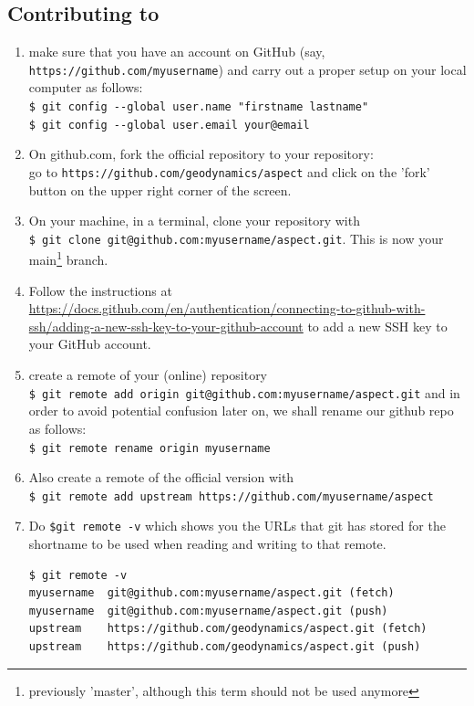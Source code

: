
\subsection{Contributing to \aspect}

\begin{enumerate}
\item make sure that you  have an account on GitHub (say, \verb"https://github.com/myusername") 
and carry out a proper setup on your local computer as follows:\\
\verb'$ git config --global user.name "firstname lastname" '\\
\verb'$ git config --global user.email your@email'

\item On github.com, fork the official \aspect repository to your repository:\\
go to \verb"https://github.com/geodynamics/aspect"
and click on the 'fork' button on the upper right corner of the screen.

\item On your machine, in a terminal, clone your repository with \\
\verb"$ git clone git@github.com:myusername/aspect.git". 
This is now your main\footnote{previously 'master', although this term should not be used anymore} branch.

\item 
Follow the instructions at \url{https://docs.github.com/en/authentication/connecting-to-github-with-ssh/adding-a-new-ssh-key-to-your-github-account}
to add a new SSH key to your GitHub account.
 
\item create a remote of your (online) repository\\
\verb"$ git remote add origin git@github.com:myusername/aspect.git"
and in order to avoid potential confusion later on, we shall rename our github repo as follows:\\
\verb"$ git remote rename origin myusername" 

\item Also create a remote of the official version with\\
\verb"$ git remote add upstream https://github.com/myusername/aspect"

\item Do \verb"$git remote -v" which shows you the URLs that git 
has stored for the shortname to be used when reading and writing to that remote.
\begin{verbatim}
$ git remote -v
myusername	git@github.com:myusername/aspect.git (fetch)
myusername	git@github.com:myusername/aspect.git (push)
upstream	https://github.com/geodynamics/aspect.git (fetch)
upstream	https://github.com/geodynamics/aspect.git (push)
\end{verbatim}

\end{enumerate}


